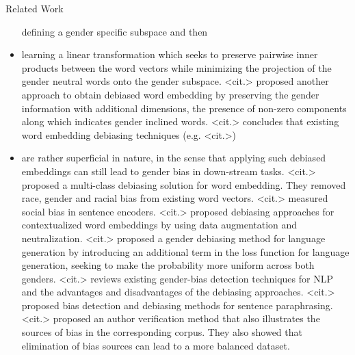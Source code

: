 \documentclass{beamer}
\begin{document}
\begin{frame}{Related Work}
\begin{itemize}
defining a gender specific subspace and then
\item
learning a linear transformation which seeks to preserve pairwise inner products between the word vectors while minimizing the projection of the gender neutral words onto the gender subspace. <cit.> proposed another approach to obtain debiased  word embedding by preserving the gender information with additional dimensions, the presence of non-zero components along which indicates gender inclined words. <cit.> concludes that existing word embedding debiasing techniques (e.g. <cit.>)
\item
are rather superficial in nature, in the sense that applying such debiased embeddings can still lead to gender bias in down-stream tasks. <cit.> proposed a multi-class debiasing solution for word embedding. They removed race, gender and racial bias from existing word vectors. <cit.> measured social bias in sentence encoders. <cit.> proposed debiasing approaches for contextualized word embeddings by using data augmentation and neutralization. <cit.> proposed a gender debiasing method for language generation by introducing an additional term in the loss function for language generation, seeking to make the probability more uniform across both genders. <cit.> reviews existing gender-bias detection techniques for NLP and the advantages and disadvantages of the debiasing approaches. <cit.> proposed bias detection and debiasing methods for sentence paraphrasing. <cit.> proposed an author verification method that also illustrates the sources of bias in the corresponding corpus. They also showed that elimination of bias sources can lead to a more balanced dataset.
\end{itemize}
\end{frame}
%
\end{document}
